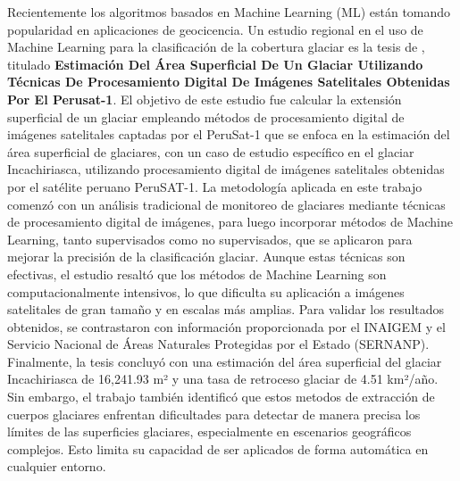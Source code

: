 
 Recientemente los algoritmos basados en Machine Learning (ML) están tomando popularidad en aplicaciones de geocicencia. Un estudio regional en el uso de Machine Learning para la clasificación de la cobertura glaciar es la tesis de \parencite{garcia2022estimacion}, titulado \textbf{Estimación Del Área Superficial De Un Glaciar Utilizando Técnicas De Procesamiento Digital De Imágenes Satelitales Obtenidas Por El Perusat-1}. El objetivo de este estudio fue calcular la extensión superficial de un glaciar empleando métodos de procesamiento digital de imágenes satelitales captadas por el PeruSat-1 que se enfoca en la estimación del área superficial de glaciares, con un caso de estudio específico en el glaciar Incachiriasca, utilizando procesamiento digital de imágenes satelitales obtenidas por el satélite peruano PeruSAT-1. La metodología aplicada en este trabajo comenzó con un análisis tradicional de monitoreo de glaciares mediante técnicas de procesamiento digital de imágenes, para luego incorporar métodos de Machine Learning, tanto supervisados como no supervisados, que se aplicaron para mejorar la precisión de la clasificación glaciar. Aunque estas técnicas son efectivas, el estudio resaltó que los métodos de Machine Learning son computacionalmente intensivos, lo que dificulta su aplicación a imágenes satelitales de gran tamaño y en escalas más amplias. Para validar los resultados obtenidos, se contrastaron con información proporcionada por el INAIGEM y el Servicio Nacional de Áreas Naturales Protegidas por el Estado (SERNANP). Finalmente, la tesis concluyó con una estimación del área superficial del glaciar Incachiriasca de 16,241.93 m² y una tasa de retroceso glaciar de 4.51 km²/año. Sin embargo, el trabajo también identificó que estos metodos de extracción de cuerpos glaciares enfrentan dificultades para detectar de manera precisa los límites de las superficies glaciares, especialmente en escenarios geográficos complejos. Esto limita su capacidad de ser aplicados de forma automática en cualquier entorno.
 

